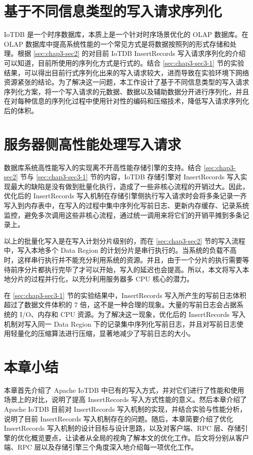 \section{基于不同信息类型的写入请求序列化}
IoTDB 是一个时序数据库，本质上是一个针对时序场景优化的 OLAP 数据库\cite{谭新宇2023一致性协议}。在 OLAP 数据库中提高系统性能的一个常见方式是将数据按照列的形式存储和处理。根据 \ref{sec:chap3-sec2} 的对目前 IoTDB InsertRecords 写入请求序列化的介绍可以知道，目前所使用的序列化方式是行式的。结合 \ref{sec:chap3-sec3-1} 节的实验结果，可以得出目前行式序列化出来的写入请求较大，进而导致在实验环境下网络资源紧张的结论。为了解决这一问题，本工作设计了基于不同信息类型的写入请求序列化方案，将一个写入请求的元数据、数据以及辅助数据分开进行序列化，并且在对每种信息的序列化过程中使用针对性的编码和压缩技术，降低写入请求序列化后的体积。

\section{服务器侧高性能处理写入请求}
数据库系统高性能写入的实现离不开高性能存储引擎的支持。结合 \ref{sec:chap3-sec2} 节与 \ref{sec:chap3-sec3-1} 节的内容，IoTDB 存储引擎对 InsertRecords 写入实现最大的缺陷是没有做到批量化执行，造成了一些非核心流程的开销过大。因此，优化后的 InsertRecords 写入机制在存储引擎侧执行写入请求时会将多条记录一齐写入到内存表中，在写入的过程中集中序列化写前日志、更新内存缓存、记录系统监控，避免多次调用这些非核心流程，通过统一调用来将它们的开销平摊到多条记录上。

以上的批量化写入是在写入计划分片级别的，而在 \ref{sec:chap3-sec2} 节的写入流程中，写入本地多个 Data Region 的计划分片是串行执行的。当系统的负载不高时，这样串行执行并不能充分利用系统的资源。并且，由于一个分片的执行需要等待前序分片都执行完毕了才可以开始，写入的延迟也会提高。所以，本文将写入本地分片的过程并行化，以充分利用服务器多 CPU 核心的潜力。

在 \ref{sec:chap3-sec3-1} 节的实验结果中，InsertRecords 写入所产生的写前日志体积超过了数据文件体积的 7 倍，这不是一种合理的现象。大量的写前日志会占据系统的 I/O、内存和 CPU 资源。为了解决这一现象，优化后的 InsertRecords 写入机制对写入同一 Data Region 下的记录集中序列化写前日志，并且对写前日志使用轻量化的压缩算法进行压缩，显著地减少了写前日志的大小。


\section{本章小结}
本章首先介绍了 Apache IoTDB 中已有的写入方式，并对它们进行了性能和使用场景上的对比，说明了提高 InsertRecords 写入方式性能的意义。然后本章介绍了 Apache IoTDB 目前对 InsertRecords 写入机制的实现，并结合实验与性能分析，说明了目前 InsertRecords 写入机制存在的问题。随后，本章简要介绍了优化 InsertRecords 写入机制的设计目标与设计思路，以及对客户端、RPC 层、存储引擎的优化概览要点，让读者从全局的视角了解本文的优化工作。后文将分别从客户端、RPC 层以及存储引擎三个角度深入地介绍每一项优化工作。

